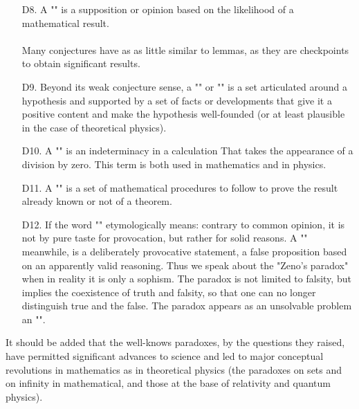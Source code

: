 \begin{itemize}
	\item[D8.] A "" is a supposition or opinion based on the likelihood of a mathematical result.\\\\
	Many conjectures have as as little similar to lemmas, as they are checkpoints to obtain significant results.
	
	\item[D9.] Beyond its weak conjecture sense, a "" or "" is a set articulated around a hypothesis and supported by a set of facts or developments that give it a positive content and make the hypothesis well-founded (or at least plausible in the case of theoretical physics). 

	\item[D10.]  A "" is an indeterminacy in a calculation That takes the appearance of a division by zero. This term is both used in mathematics and in physics. 

	\item[D11.] A "" is a set of mathematical procedures to follow to prove the result already known or not of a theorem. 

	\item[D12.] If the word "" etymologically means: contrary to common opinion, it is not by pure taste for provocation, but rather for solid reasons. A "" meanwhile, is a deliberately provocative statement, a false proposition based on an apparently valid reasoning. Thus we speak about the "Zeno's paradox" when in reality it is only a sophism. The paradox is not limited to falsity, but implies the coexistence of truth and falsity, so that one can no longer distinguish true and the false. The paradox appears as an unsolvable problem an "". 
	
\end{itemize}

	\begin{tcolorbox}[title=Remark,colframe=black,arc=10pt]
It should be added that the well-knows paradoxes, by the questions they raised, have permitted significant advances to science and led to major conceptual revolutions in mathematics as in theoretical physics (the paradoxes on sets and on infinity in mathematical, and those at the base of relativity and quantum physics).
	\end{tcolorbox}	


